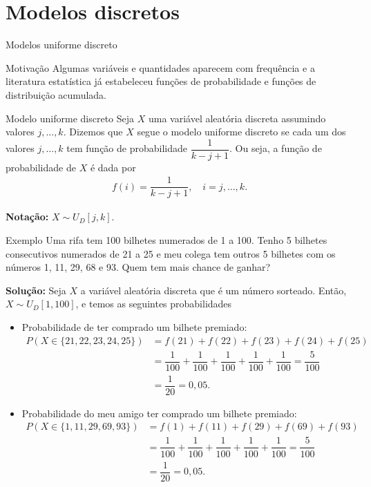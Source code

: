 \documentclass[9pt]{beamer}
\begin{document}
\section{Modelos discretos}

\begin{frame}{Modelos uniforme discreto}
\begin{block}{Motivação}
	Algumas variáveis e quantidades aparecem com frequência e a literatura estatística já estabeleceu funções de probabilidade e funções de distribuição acumulada.
\end{block}

\begin{block}{Modelo uniforme discreto}
	Seja $X$ uma variável aleatória discreta assumindo valores $j, \dots, k$. Dizemos que $X$ segue o modelo uniforme discreto se cada um dos valores $j, \dots, k$ tem função de probabilidade $\dfrac{1}{k-j+1}$. Ou seja, a função de probabilidade de $X$ é dada por
	\begin{align*}
	f(i) = \dfrac{1}{k - j + 1}, \quad i=j, \dots, k.
	\end{align*}
\end{block}

\textbf{Notação:} $X \sim U_D[j,k]$.
\end{frame}

\begin{frame}{Exemplo}
Uma rifa tem 100 bilhetes numerados de 1 a 100. Tenho 5 bilhetes consecutivos numerados de 21 a 25 e meu colega tem outros 5 bilhetes com os números 1, 11, 29, 68 e 93. Quem tem mais chance de ganhar?
\vfill

\textbf{Solução:} Seja $X$ a variável aleatória discreta que é um número sorteado. Então, $X \sim U_D[1,100]$, e temos as seguintes probabilidades
\begin{itemize}
 \item Probabilidade de ter comprado um bilhete premiado:
 \begin{align*}
  P(X \in \{21,22,23,24,25\}) &= f(21)+f(22) + f(23) +f(24)+f(25)\\
  &= \dfrac{1}{100} +\dfrac{1}{100} +\dfrac{1}{100} +\dfrac{1}{100} +\dfrac{1}{100} = \dfrac{5}{100}\\
  &= \dfrac{1}{20}=0,05.
 \end{align*}
 \item Probabilidade do meu amigo ter comprado um bilhete premiado:
 \begin{align*}
  P(X \in \{1,11,29,69,93\}) &= f(1)+f(11) + f(29) +f(69)+f(93)\\
  &= \dfrac{1}{100} +\dfrac{1}{100} +\dfrac{1}{100} +\dfrac{1}{100} +\dfrac{1}{100} = \dfrac{5}{100}\\
  &= \dfrac{1}{20}=0,05.
 \end{align*}

\end{itemize}

\end{frame}
\end{document}
